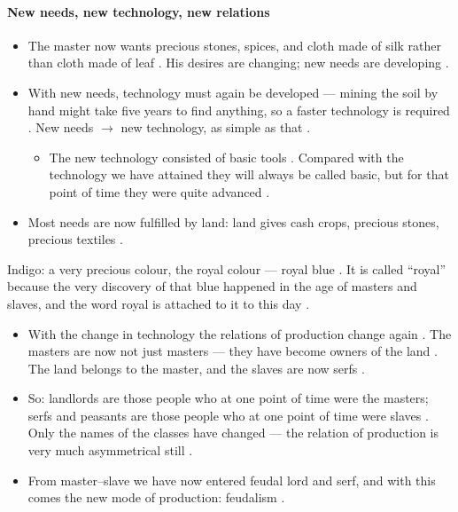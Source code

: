 \paragraph{New needs, new technology, new relations}
\begin{itemize}
    \item The master now wants precious stones, spices, and cloth made of silk rather than cloth made of leaf . His desires are changing; new needs are developing .
    \item With new needs, technology must again be developed --- mining the soil by hand might take five years to find anything, so a faster technology is required . New needs $\rightarrow$ new technology, as simple as that .
    \begin{itemize}
        \item The new technology consisted of basic tools . Compared with the technology we have attained they will always be called basic, but for that point of time they were quite advanced .
    \end{itemize}
    \item Most needs are now fulfilled by land: land gives cash crops, precious stones, precious textiles .
\end{itemize}

\begin{ExampleBox}
Indigo: a very precious colour, the royal colour --- royal blue . It is called ``royal'' because the very discovery of that blue happened in the age of masters and slaves, and the word royal is attached to it to this day .
\end{ExampleBox}

\begin{itemize}
    \item With the change in technology the relations of production change again . The masters are now not just masters --- they have become owners of the land . The land belongs to the master, and the slaves are now serfs .
    \item So: landlords are those people who at one point of time were the masters; serfs and peasants are those people who at one point of time were slaves . Only the names of the classes have changed --- the relation of production is very much asymmetrical still .
    \item From master--slave we have now entered feudal lord and serf, and with this comes the new mode of production: feudalism .
\end{itemize}

